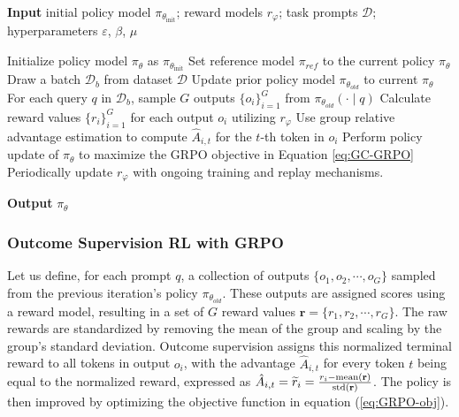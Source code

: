 \begin{algorithm}[t]
  \small
  \caption{Iterative Group Relative Policy Optimization}
  \textbf{Input} initial policy model $\pi_{\theta_{\text{init}}}$; reward models $r_\varphi$; task prompts $\mathcal{D}$; 
  hyperparameters $\varepsilon$, $\beta$, $\mu$
  \begin{algorithmic}[1]
    \State Initialize policy model $\pi_\theta$ as $\pi_{\theta_{\text{init}}}$
       \State Set reference model $\pi_{ref}$ to the current policy $\pi_{\theta}$
      \State Draw a batch $\mathcal{D}_b$ from dataset $\mathcal{D}$
      \State Update prior policy model $\pi_{\theta_{old}}$ to current $\pi_{\theta}$ 
      \State For each query $q$ in $\mathcal{D}_b$, sample $G$ outputs $\{o_i\}_{i=1}^G$ from $\pi_{\theta_{old}} (\cdot \mid q)$
      \State Calculate reward values $\{r_i\}_{i=1}^{G}$ for each output $o_i$ utilizing $r_\varphi$
      \State Use group relative advantage estimation to compute $\hat{A}_{i,t}$ for the $t$-th token in $o_i$
        \State Perform policy update of $\pi_{\theta}$ to maximize the GRPO objective in Equation \ref{eq:GC-GRPO}
      \EndFor
    \EndFor 
    \State Periodically update $r_\varphi$ with ongoing training and replay mechanisms.
    \EndFor 
  \end{algorithmic}
  \textbf{Output} $\pi_\theta$
  \label{alg:iter-grpo}
\end{algorithm}

\subsubsection{Outcome Supervision RL with GRPO} Let us define, for each prompt $q$, a collection of outputs $\{o_1, o_2, \cdots, o_G\}$ sampled from the previous iteration's policy $\pi_{\theta_{old}}$. These outputs are assigned scores using a reward model, resulting in a set of $G$ reward values $\mathbf{r} = \{r_1, r_2, \cdots, r_G\}$. The raw rewards are standardized by removing the mean of the group and scaling by the group's standard deviation. Outcome supervision assigns this normalized terminal reward to all tokens in output $o_i$, with the advantage $\hat{A}_{i, t}$ for every token $t$ being equal to the normalized reward, expressed as $\hat{A}_{i, t} = \widetilde{r}_i = \frac{r_i- {\rm mean}(\mathbf{r})}{{\rm std}(\mathbf{r})}$. The policy is then improved by optimizing the objective function in equation (\ref{eq:GRPO-obj}).

